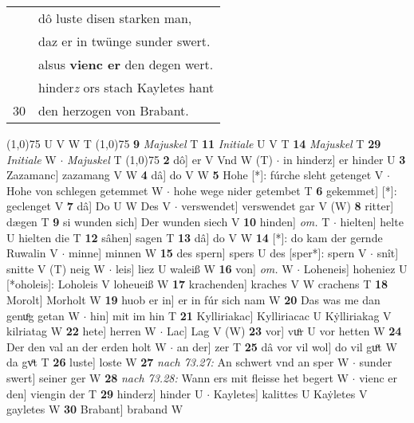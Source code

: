 \documentclass[8pt,a4paper,notitlepage]{article}
\begin{document}
\begin{table}[ht]
\begin{minipage}[t]{0.5\linewidth}
\begin{tabular}{rl}
 & dô luste disen starken man,\\ 
 & daz er in twünge sunder swert.\\ 
 & alsus \textbf{vienc er} den degen wert.\\ 
 & hinder\textit{z} ors stach Kayletes hant\\ 
30 & den herzogen von Brabant.\\ 
\end{tabular}
\scriptsize
\line(1,0){75} \newline
U V W T \newline
\line(1,0){75} \newline
\textbf{9} \textit{Majuskel} T  \textbf{11} \textit{Initiale} U V T  \textbf{14} \textit{Majuskel} T  \textbf{29} \textit{Initiale} W   $\cdot$ \textit{Majuskel} T  \newline
\line(1,0){75} \newline
\textbf{2} dô] er V Vnd W (T)  $\cdot$ in hinderz] er hinder U \textbf{3} Zazamanc] zazamang V W \textbf{4} dâ] do V W \textbf{5} Hohe [*]: fúrche sleht getenget V  $\cdot$ Hohe von schlegen getemmet W  $\cdot$ hohe wege nider getembet T \textbf{6} gekemmet] [*]: geclenget V \textbf{7} dâ] Do U W Des V  $\cdot$ verswendet] verswendet gar V (W) \textbf{8} ritter] dægen T \textbf{9} si wunden sich] Der wunden siech V \textbf{10} hinden] \textit{om.} T  $\cdot$ hielten] helte U hielten die T \textbf{12} sâhen] sagen T \textbf{13} dâ] do V W \textbf{14} [*]: do kam der gernde Ruwalin V  $\cdot$ minne] minnen W \textbf{15} des spern] spers U des [sper*]: spern V  $\cdot$ snît] snitte V (T) neig W  $\cdot$ leis] liez U waleiß W \textbf{16} von] \textit{om.} W  $\cdot$ Loheneis] hoheniez U [*oholeis]: Loholeis V loheueiß W \textbf{17} krachenden] kraches V W crachens T \textbf{18} Morolt] Morholt W \textbf{19} huob er in] er in fúr sich nam W \textbf{20} Das was me dan genuͦg getan W  $\cdot$ hin] mit im hin T \textbf{21} Kylliriakac] Kylliriacac U Kẏlliriakag V kilriatag W \textbf{22} hete] herren W  $\cdot$ Lac] Lag V (W) \textbf{23} vor] vuͦr U vor hetten W \textbf{24} Der den val an der erden holt W  $\cdot$ an der] zer T \textbf{25} dâ vor vil wol] do vil guͦt W da gvͦt T \textbf{26} luste] loste W \textbf{27} \textit{nach 73.27:} An schwert vnd an sper W   $\cdot$ sunder swert] seiner ger W \textbf{28} \textit{nach 73.28:} Wann ers mit fleisse het begert W   $\cdot$ vienc er den] viengin der T \textbf{29} hinderz] hinder U  $\cdot$ Kayletes] kalittes U Kaẏletes V gayletes W \textbf{30} Brabant] braband W \newline
\end{minipage}
\end{table}
\end{document}
